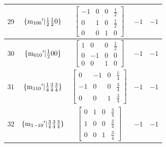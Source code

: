 \documentclass[fleqn,8pt]{jsarticle}
\begin{document}
\begin{longtable}{ccccc}
$ 29 $ & $ \{{\rm m}_{100}{}'|\frac{1}{2} \frac{1}{2} 0\} $ & $ \begin{bmatrix} -1 & 0 & 0 & \frac{1}{2} \\ 0 & 1 & 0 & \frac{1}{2} \\ 0 & 0 & 1 & 0 \end{bmatrix} $ & $ -1 $ & $ -1 $ \\ \hline
$ 30 $ & $ \{{\rm m}_{010}{}'|\frac{1}{2} 0 0\} $ & $ \begin{bmatrix} 1 & 0 & 0 & \frac{1}{2} \\ 0 & -1 & 0 & 0 \\ 0 & 0 & 1 & 0 \end{bmatrix} $ & $ -1 $ & $ -1 $ \\ \hline
$ 31 $ & $ \{{\rm m}_{110}{}'|\frac{1}{4} \frac{3}{4} \frac{3}{4}\} $ & $ \begin{bmatrix} 0 & -1 & 0 & \frac{1}{4} \\ -1 & 0 & 0 & \frac{3}{4} \\ 0 & 0 & 1 & \frac{3}{4} \end{bmatrix} $ & $ -1 $ & $ -1 $ \\ \hline
$ 32 $ & $ \{{\rm m}_{1-10}{}'|\frac{3}{4} \frac{3}{4} \frac{3}{4}\} $ & $ \begin{bmatrix} 0 & 1 & 0 & \frac{3}{4} \\ 1 & 0 & 0 & \frac{3}{4} \\ 0 & 0 & 1 & \frac{3}{4} \end{bmatrix} $ & $ -1 $ & $ -1 $ \\
\end{longtable}
\end{document}
